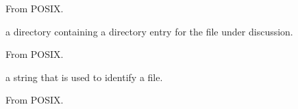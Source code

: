 \begin{defnote}
From POSIX.
\end{defnote}

%
a directory containing a directory entry for the file under discussion.

\begin{defnote}
From POSIX.
\end{defnote}

%
a string that is used to identify a file.

\begin{defnote}
From POSIX.
\end{defnote}
